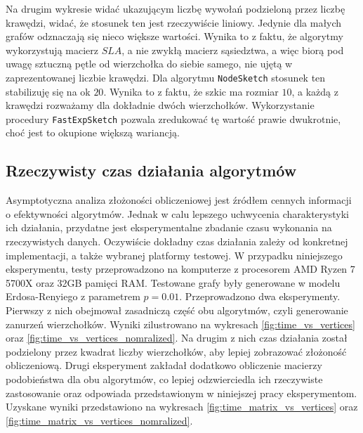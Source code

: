 Na drugim wykresie widać ukazującym liczbę wywołań podzieloną przez liczbę krawędzi, widać, że stosunek ten jest rzeczywiście liniowy. Jedynie dla małych grafów odznaczają się nieco większe wartości. Wynika to z faktu, że algorytmy wykorzystują macierz $SLA$, a nie zwykłą macierz sąsiedztwa, a więc biorą pod uwagę sztuczną pętle od wierzchołka do siebie samego, nie ujętą w zaprezentowanej liczbie krawędzi. Dla algorytmu \texttt{NodeSketch} stosunek ten stabilizuję się na ok $20$. Wynika to z faktu, że szkic ma rozmiar $10$, a każdą z krawędzi rozważamy dla dokładnie dwóch wierzchołków. Wykorzystanie procedury \texttt{FastExpSketch} pozwala zredukować tę wartość prawie dwukrotnie, choć jest to okupione większą wariancją.  

\subsection{Rzeczywisty czas działania algorytmów}

Asymptotyczna analiza złożoności obliczeniowej jest źródłem cennych informacji o efektywności algorytmów. Jednak w calu lepszego uchwycenia charakterystyki ich działania, przydatne jest eksperymentalne zbadanie czasu wykonania na rzeczywistych danych. Oczywiście dokładny czas działania zależy od konkretnej implementacji, a także wybranej platformy testowej. W przypadku niniejszego eksperymentu, testy przeprowadzono na komputerze z procesorem AMD Ryzen 7 5700X oraz 32GB pamięci RAM. Testowane grafy były generowane w modelu Erdosa-Renyiego z parametrem $p = 0.01$. Przeprowadzono dwa eksperymenty. Pierwszy z nich obejmował zasadniczą część obu algorytmów, czyli generowanie zanurzeń wierzchołków. Wyniki zilustrowano na wykresach \ref{fig:time_vs_vertices} oraz \ref{fig:time_vs_vertices_nomralized}. Na drugim z nich czas działania został podzielony przez kwadrat liczby wierzchołków, aby lepiej zobrazować złożoność obliczeniową. Drugi eksperyment zakładał dodatkowo obliczenie macierzy podobieństwa dla obu algorytmów, co lepiej odzwierciedla ich rzeczywiste zastosowanie oraz odpowiada przedstawionym w niniejszej pracy eksperymentom. Uzyskane wyniki przedstawiono na wykresach \ref{fig:time_matrix_vs_vertices} oraz \ref{fig:time_matrix_vs_vertices_nomralized}.

